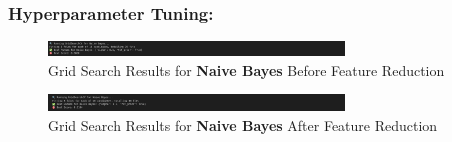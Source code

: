 \documentclass[a4paper,12pt]{article}
\begin{document}
\subsubsection{Hyperparameter Tuning:}
\begin{figure}[H]
    \centering
    \includegraphics[width=0.7\textwidth]{./images/gsnb1.png}
    \caption{Grid Search Results for \textbf{Naive Bayes} Before Feature Reduction}
    \label{fig:fig_11}
\end{figure}
\begin{figure}[H]
    \centering
    \includegraphics[width=0.7\textwidth]{./images/gsnb2.png}
    \caption{Grid Search Results for \textbf{Naive Bayes} After Feature Reduction}
    \label{fig:fig_12}
\end{figure}
\end{document}
